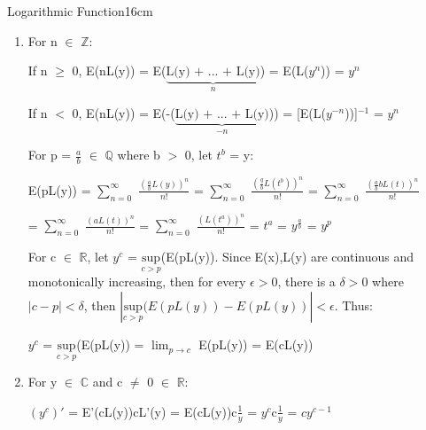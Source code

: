 \begin{definition}{Logarithmic Function}{16cm}
\begin{enumerate}[label=(\alph*), leftmargin=1.5cm, itemsep=0.1cm]
            \item For n $\in$ $\mathbb{Z}$:
            
                \hspace{0.3cm}
                If n $\geq$ 0,
                E(nL(y)) = E($\underbrace{\text{L(y) + ... + L(y)}}_{n}$)
                = E(L($y^n$)) = $y^n$

                \hspace{0.3cm}
                If n $<$ 0,
                E(nL(y)) = E(-($\underbrace{\text{L(y) + ... + L(y)}}_{-n}$))
                = [E(L($y^{-n}$))]$^{-1}$ = $y^n$

                For p = $\frac{a}{b}$ $\in$ $\mathbb{Q}$ where b $>$ 0,
                let $t^b$ = y:

                \hspace{0.5cm}
                E(pL(y))
                = $\sum_{n=0}^{\infty}$ $\frac{(\frac{a}{b}L(y))^n}{n!}$
                = $\sum_{n=0}^{\infty}$ $\frac{(\frac{q}{b}L(t^b))^n}{n!}$
                = $\sum_{n=0}^{\infty}$ $\frac{(\frac{a}{b}bL(t))^n}{n!}$

                \hspace{2.3cm}
                = $\sum_{n=0}^{\infty}$ $\frac{(aL(t))^n}{n!}$
                = $\sum_{n=0}^{\infty}$ $\frac{(L(t^a))^n}{n!}$
                = $t^a$
                = $y^{\frac{a}{b}}$ = $y^p$

                For c $\in$ $\mathbb{R}$, let $y^c$
                = $\underset{c > p}{\text{sup}}$(E(pL(y)).
                Since E(x),L(y) are continuous and monotonically increasing,
                then for every $\epsilon > 0$, there is a $\delta > 0$
                where $|c-p| < \delta$, then
                $|\underset{c>p}{\text{sup}}(E(pL(y)) - E(pL(y))| < \epsilon$.
                Thus:

                \hspace{0.5cm}
                $y^c$ = $\underset{c > p}{\text{sup}}$(E(pL(y))
                = $\lim_{p \rightarrow c}$ E(pL(y))
                = E(cL(y))

            \item For y $\in$ $\mathbb{C}$ and c $\not =$ 0 $\in$ $\mathbb{R}$:
            
                \hspace{0.5cm}
                $(y^c)'$ = E'(cL(y))cL'(y)
                = E(cL(y))c$\frac{1}{y}$
                = $y^c$c$\frac{1}{y}$
                = $c y^{c-1}$


\end{enumerate}
\end{definition}
